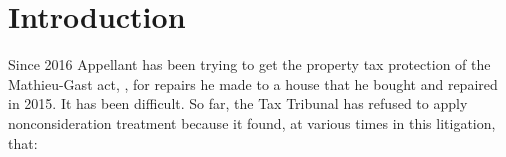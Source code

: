 \documentclass[12pt,\documentclassflag]{michiganCourtOfAppealsBrief}
\begin{document}







\newpage
\pagestyle{plain}

\section{Introduction}

Since 2016 Appellant has been trying to get the property tax protection of the Mathieu-Gast act, \mathieuGast, for repairs he made to a house that he bought and repaired in 2015. It has been difficult. So far, the Tax Tribunal has refused to apply nonconsideration treatment because it found, at various times in this litigation, that:
\end{document}
